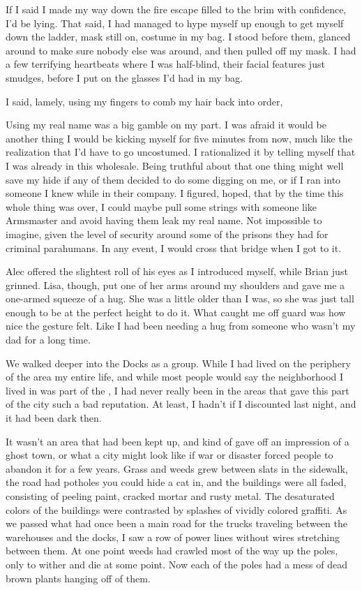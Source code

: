If I said I made my way down the fire escape filled to the brim with confidence, I'd be lying. That said, I had managed to hype myself up enough to get myself down the ladder, mask still on, costume in my bag. I stood before them, glanced around to make sure nobody else was around, and then pulled off my mask. I had a few terrifying heartbeats where I was half-blind, their facial features just smudges, before I put on the glasses I'd had in my bag.

 I said, lamely, using my fingers to comb my hair back into order, 

Using my real name was a big gamble on my part. I was afraid it would be another thing I would be kicking myself for five minutes from now, much like the realization that I'd have to go uncostumed. I rationalized it by telling myself that I was already in this wholesale. Being truthful about that one thing might well save my hide if any of them decided to do some digging on me, or if I ran into someone I knew while in their company. I figured, hoped, that by the time this whole thing was over, I could maybe pull some strings with someone like Armsmaster and avoid having them leak my real name. Not impossible to imagine, given the level of security around some of the prisons they had for criminal parahumans. In any event, I would cross that bridge when I got to it.

Alec offered the slightest roll of his eyes as I introduced myself, while Brian just grinned. Lisa, though, put one of her arms around my shoulders and gave me a one-armed squeeze of a hug. She was a little older than I was, so she was just tall enough to be at the perfect height to do it. What caught me off guard was how nice the gesture felt. Like I had been needing a hug from someone who wasn't my dad for a long time.

We walked deeper into the Docks as a group. While I had lived on the periphery of the area my entire life, and while most people would say the neighborhood I lived in was part of the , I had never really been in the areas that gave this part of the city such a bad reputation. At least, I hadn't if I discounted last night, and it had been dark then.

It wasn't an area that had been kept up, and kind of gave off an impression of a ghost town, or what a city might look like if war or disaster forced people to abandon it for a few years. Grass and weeds grew between slats in the sidewalk, the road had potholes you could hide a cat in, and the buildings were all faded, consisting of peeling paint, cracked mortar and rusty metal. The desaturated colors of the buildings were contrasted by splashes of vividly colored graffiti. As we passed what had once been a main road for the trucks traveling between the warehouses and the docks, I saw a row of power lines without wires stretching between them. At one point weeds had crawled most of the way up the poles, only to wither and die at some point. Now each of the poles had a mess of dead brown plants hanging off of them.

